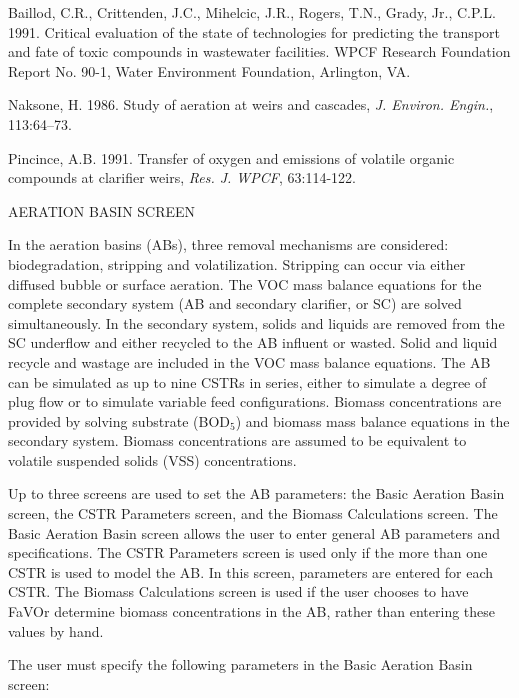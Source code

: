 
Baillod, C.R., Crittenden, J.C., Mihelcic, J.R., Rogers, T.N., Grady, Jr.,
C.P.L. 1991. Critical evaluation of the state of technologies for predicting
the transport and fate of toxic compounds in wastewater facilities. WPCF
Research Foundation Report No. 90-1, Water Environment Foundation, Arlington,
VA.

Naksone, H. 1986. Study of aeration at weirs and cascades, {\it J. Environ.
Engin.}, 113:64--73.

Pincince, A.B. 1991. Transfer of oxygen and emissions of volatile organic
compounds at clarifier weirs, {\it Res. J. WPCF}, 63:114-122.




\newpage

AERATION BASIN SCREEN

In the aeration basins (ABs), three removal mechanisms are considered:
biodegradation, stripping and volatilization.  Stripping can occur via either
diffused bubble or surface aeration.  The VOC mass balance equations for the
complete secondary system (AB and secondary clarifier, or SC) are solved
simultaneously.  In the secondary system, solids and liquids are removed from
the SC underflow and either recycled to the AB influent or wasted.  Solid and
liquid recycle and wastage are included in the VOC mass balance equations.  The
AB can be simulated as up to nine CSTRs in series, either to simulate a degree
of plug flow or to simulate variable feed configurations.  Biomass
concentrations are provided by solving substrate (BOD$_5$) and biomass mass
balance equations in the secondary system.  Biomass concentrations are assumed
to be equivalent to volatile suspended solids (VSS) concentrations.

Up to three screens are used to set the AB parameters: the Basic Aeration Basin
screen, the CSTR Parameters screen, and the Biomass Calculations screen.  The
Basic Aeration Basin screen allows the user to enter general AB parameters and
specifications.  The CSTR Parameters screen is used only if the more than one
CSTR is used to model the AB. In this screen, parameters are entered for each
CSTR.  The Biomass Calculations screen is used if the user chooses to have
FaVOr determine biomass concentrations in the AB, rather than entering these
values by hand.

The user must specify the following parameters in the Basic Aeration Basin
screen:

